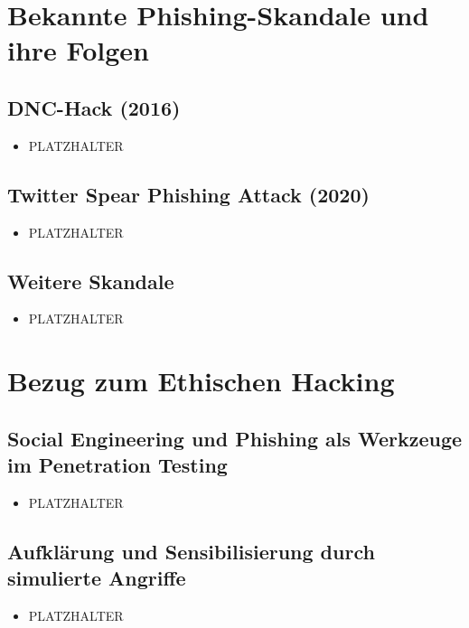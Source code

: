 \documentclass[12pt, a4paper, oneside]{scrartcl}
\begin{document}
\section{Bekannte Phishing-Skandale und ihre Folgen}

\subsection{DNC-Hack (2016)}
\begin{itemize}
  \item PLATZHALTER
\end{itemize}

\subsection{Twitter Spear Phishing Attack (2020)}
\begin{itemize}
  \item PLATZHALTER
\end{itemize}

\subsection{Weitere Skandale}
\begin{itemize}
  \item PLATZHALTER
\end{itemize}

\section{Bezug zum Ethischen Hacking}

\subsection{Social Engineering und Phishing als Werkzeuge im Penetration Testing}
\begin{itemize}
  \item PLATZHALTER
\end{itemize}

\subsection{Aufklärung und Sensibilisierung durch simulierte Angriffe}
\begin{itemize}
  \item PLATZHALTER
\end{itemize}
\end{document}
